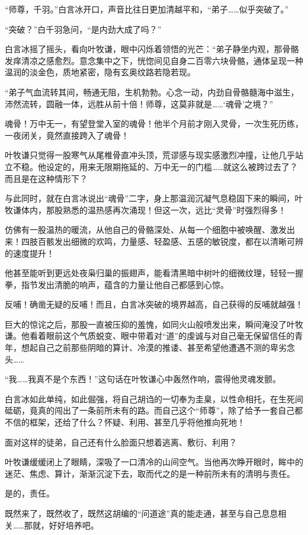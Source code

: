 “师尊，千羽。”白言冰开口，声音比往日更加清越平和，“弟子……似乎突破了。”

“突破？”白千羽急问，“是内劲大成了吗？”

白言冰摇了摇头，看向叶牧谦，眼中闪烁着领悟的光芒：“弟子静坐内观，那骨骼发痒清凉之感愈烈。意念集中之下，恍惚间见自身二百零六块骨骼，通体呈现一种温润的淡金色，质地紧密，隐有玄奥纹路若隐若现。

“弟子气血流转其间，畅通无阻，生机勃勃。心念一动，内劲自骨骼髓海中滋生，沛然流转，圆融一体，远胜从前十倍！师尊，这莫非就是……‘魂骨’之境？”

魂骨！万中无一，有望登堂入室的魂骨！他半个月前才刚入灵骨，一次生死历练，一夜闭关，竟然直接跨入了魂骨！

叶牧谦只觉得一股寒气从尾椎骨直冲头顶，荒谬感与现实感激烈冲撞，让他几乎站立不稳。他设定的，用来无限期拖延的、万中无一的门槛……就这么被跨过去了？而且是在这种情形下？

与此同时，就在白言冰说出“魂骨”二字，身上那温润沉凝气息稳固下来的瞬间，叶牧谦体内，那股熟悉的温热感再次涌现！但这一次，远比“灵骨”时强烈得多！

仿佛有一股温热的暖流，从他自己的骨骼深处、从每一个细胞中被唤醒、激发出来！四肢百骸发出细微的欢鸣，力量感、轻盈感、五感的敏锐度，都在以清晰可辨的速度提升！

他甚至能听到更远处夜枭归巢的振翅声，能看清黑暗中树叶的细微纹理，轻轻一握拳，指节发出清脆的响声，蕴含的力量让他自己都感到心惊。

反哺！确凿无疑的反哺！而且，白言冰突破的境界越高，自己获得的反哺就越强！

巨大的惊诧之后，那股一直被压抑的羞愧，如同火山般喷发出来，瞬间淹没了叶牧谦。他看着眼前这个气质蜕变、眼中带着对“道”的虔诚与对自己毫无保留信任的青年，想起自己之前那些阴暗的算计、冷漠的推诿、甚至希望他遭遇不测的卑劣念头……

“我……我真不是个东西！”这句话在叶牧谦心中轰然作响，震得他灵魂发颤。

白言冰如此单纯，如此倔强，将自己胡诌的一切奉为圭臬，以性命相托，在生死间砥砺，竟真的闯出了一条前所未有的路。而自己这个“师尊”，除了给予一套自己都不信的框架，还给了什么？怀疑、利用、甚至几乎将他推向死地！

面对这样的徒弟，自己还有什么脸面只想着逃离、敷衍、利用？

叶牧谦缓缓闭上了眼睛，深吸了一口清冷的山间空气。当他再次睁开眼时，眸中的迷茫、焦虑、算计，渐渐沉淀下去，取而代之的是一种前所未有的清明与责任。

是的，责任。

既然来了，既然收了，既然这胡编的“问道途”真的能走通，甚至与自己息息相关……那就，好好培养吧。

